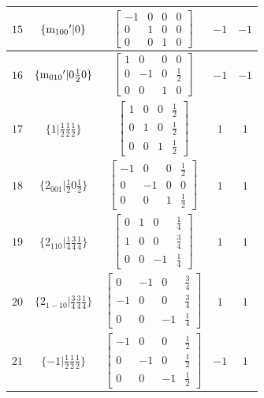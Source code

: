 \documentclass[fleqn,8pt]{jsarticle}
\begin{document}
\begin{longtable}{ccccc}
$ 15 $ & $ \{{\rm m}_{100}{}'|0\} $ & $ \begin{bmatrix} -1 & 0 & 0 & 0 \\ 0 & 1 & 0 & 0 \\ 0 & 0 & 1 & 0 \end{bmatrix} $ & $ -1 $ & $ -1 $ \\ \hline
$ 16 $ & $ \{{\rm m}_{010}{}'|0 \frac{1}{2} 0\} $ & $ \begin{bmatrix} 1 & 0 & 0 & 0 \\ 0 & -1 & 0 & \frac{1}{2} \\ 0 & 0 & 1 & 0 \end{bmatrix} $ & $ -1 $ & $ -1 $ \\ \hline
$ 17 $ & $ \{1|\frac{1}{2} \frac{1}{2} \frac{1}{2}\} $ & $ \begin{bmatrix} 1 & 0 & 0 & \frac{1}{2} \\ 0 & 1 & 0 & \frac{1}{2} \\ 0 & 0 & 1 & \frac{1}{2} \end{bmatrix} $ & $ 1 $ & $ 1 $ \\ \hline
$ 18 $ & $ \{2{}_{001}|\frac{1}{2} 0 \frac{1}{2}\} $ & $ \begin{bmatrix} -1 & 0 & 0 & \frac{1}{2} \\ 0 & -1 & 0 & 0 \\ 0 & 0 & 1 & \frac{1}{2} \end{bmatrix} $ & $ 1 $ & $ 1 $ \\ \hline
$ 19 $ & $ \{2{}_{110}|\frac{1}{4} \frac{3}{4} \frac{1}{4}\} $ & $ \begin{bmatrix} 0 & 1 & 0 & \frac{1}{4} \\ 1 & 0 & 0 & \frac{3}{4} \\ 0 & 0 & -1 & \frac{1}{4} \end{bmatrix} $ & $ 1 $ & $ 1 $ \\ \hline
$ 20 $ & $ \{2{}_{1-10}|\frac{3}{4} \frac{3}{4} \frac{1}{4}\} $ & $ \begin{bmatrix} 0 & -1 & 0 & \frac{3}{4} \\ -1 & 0 & 0 & \frac{3}{4} \\ 0 & 0 & -1 & \frac{1}{4} \end{bmatrix} $ & $ 1 $ & $ 1 $ \\ \hline
$ 21 $ & $ \{-1|\frac{1}{2} \frac{1}{2} \frac{1}{2}\} $ & $ \begin{bmatrix} -1 & 0 & 0 & \frac{1}{2} \\ 0 & -1 & 0 & \frac{1}{2} \\ 0 & 0 & -1 & \frac{1}{2} \end{bmatrix} $ & $ -1 $ & $ 1 $ \\ \hline

\end{longtable}
\end{document}
